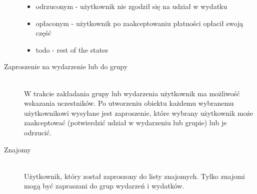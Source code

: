 \begin{description}
\begin{itemize}
    \item odrzuconym - użytkownik nie zgodził się na udział w wydatku
    \item opłaconym - użytkownik po zaakceptowaniu płatności opłacił swoją część
    \item todo - rest of the states
  \end{itemize}
\item[Zaproszenie na wydarzenie lub do grupy] \hfill \\ W trakcie zakładania grupy lub wydarzenia użytkownik ma możliwość wskazania uczestników. Po utworzeniu obiektu każdemu wybranemu użytkownikowi wysyłane jest zaproszenie, które wybrany użytkownik może zaakceptować (potwierdzić udział w wydarzeniu lub grupie) lub je odrzucić.
\item[Znajomy] \hfill \\ Użytkownik, który został zaproszony do listy znajomych. Tylko znajomi mogą być zapraszani do grup wydarzeń i wydatków.
\end{description}


